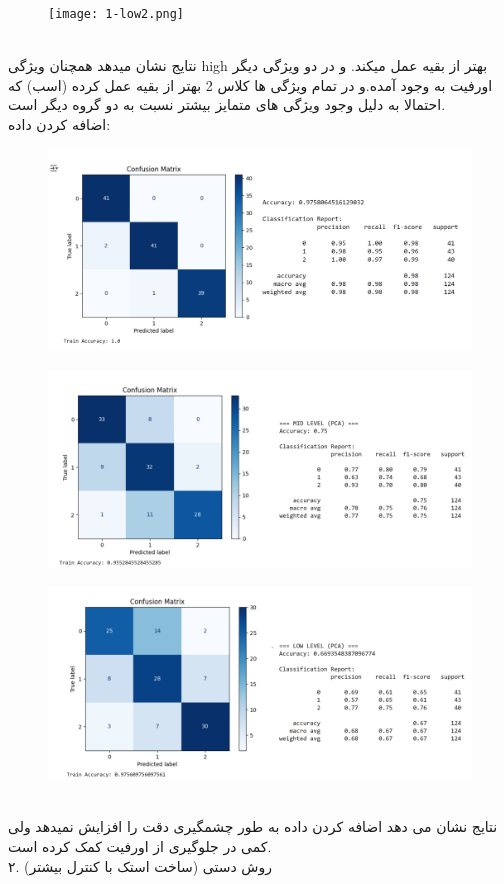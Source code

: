 \documentclass[a4paper,12pt]{article}
\begin{document}
\FloatBarrier
\begin{figure}[h]
	\centering
	\texttt{[image: 1-low2.png]}
\end{figure}
\FloatBarrier
\\
نتایج نشان میدهد همچنان ویژگی high بهتر از بقیه عمل میکند. و در دو ویژگی دیگر اورفیت به وجود آمده.و در تمام ویژگی ها کلاس 2 بهتر از بقیه عمل کرده (اسب) که احتمالا به دلیل وجود ویژگی های متمایز بیشتر نسبت به دو گروه دیگر است.
\\
اضافه کردن داده:
\\
\begin{figure}[h]
	\centering
	\includegraphics[width=1\textwidth]{2-high.png}
\end{figure}
\FloatBarrier
\begin{figure}[h]
	\centering
	\includegraphics[width=1\textwidth]{2-mid.png}
\end{figure}
\FloatBarrier
\begin{figure}[h]
	\centering
	\includegraphics[width=1\textwidth]{2-low.png}
\end{figure}
\FloatBarrier
\\
نتایج نشان می دهد اضافه کردن داده به طور چشمگیری دقت را افزایش نمیدهد ولی کمی در جلوگیری از اورفیت کمک کرده است.
\\
۲. روش دستی (ساخت استک با کنترل بیشتر)\\
\end{document}
